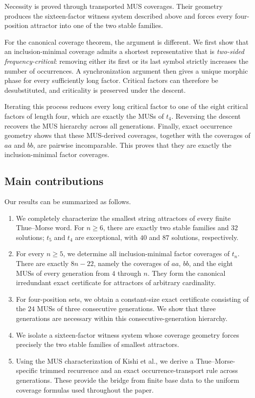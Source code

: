 \documentclass[11pt,a4paper]{article}
\theoremstyle{definition}\newtheorem{definition}[theorem]{Definition}
\theoremstyle{remark}\newtheorem{remark}[theorem]{Remark}
\begin{document}
Necessity is proved through transported MUS coverages. Their geometry produces the sixteen-factor witness system described above and forces every four-position attractor into one of the two stable families.

For the canonical coverage theorem, the argument is different. We first show that an inclusion-minimal coverage admits a shortest representative that is \emph{two-sided frequency-critical}: removing either its first or its last symbol strictly increases the number of occurrences. A synchronization argument then gives a unique morphic phase for every sufficiently long factor. Critical factors can therefore be desubstituted, and criticality is preserved under the descent.

Iterating this process reduces every long critical factor to one of the eight critical factors of length four, which are exactly the MUSs of $t_4$. Reversing the descent recovers the MUS hierarchy across all generations. Finally, exact occurrence geometry shows that these MUS-derived coverages, together with the coverages of $aa$ and $bb$, are pairwise incomparable. This proves that they are exactly the inclusion-minimal factor coverages.

\subsection{Main contributions}
Our results can be summarized as follows.
\begin{enumerate}[leftmargin=*]
\item We completely characterize the smallest string attractors of every finite Thue--Morse word. For $n\geq6$, there are exactly two stable families and $32$ solutions; $t_5$ and $t_4$ are exceptional, with $40$ and $87$ solutions, respectively.
\item For every $n\geq5$, we determine all inclusion-minimal factor coverages of $t_n$. There are exactly $8n-22$, namely the coverages of $aa$, $bb$, and the eight MUSs of every generation from $4$ through $n$. They form the canonical irredundant exact certificate for attractors of arbitrary cardinality.
\item For four-position sets, we obtain a constant-size exact certificate consisting of the $24$ MUSs of three consecutive generations. We show that three generations are necessary within this consecutive-generation hierarchy.
\item We isolate a sixteen-factor witness system whose coverage geometry forces precisely the two stable families of smallest attractors.
\item Using the MUS characterization of Kishi et al., we derive a Thue--Morse-specific trimmed recurrence and an exact occurrence-transport rule across generations. These provide the bridge from finite base data to the uniform coverage formulas used throughout the paper.
\end{enumerate}
\end{document}
